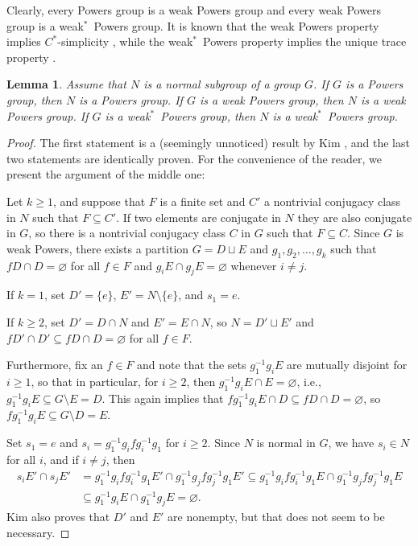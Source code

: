 \documentclass[a4paper]{amsart}
\theoremstyle{plain}
\newtheorem{lemma}[theorem]{Lemma}
\theoremstyle{definition}
\theoremstyle{remark}
\numberwithin{theorem}{section}
\begin{document}
Clearly, every Powers group is a weak Powers group and every weak Powers group is a weak$^*$~Powers group.
It is known that the weak Powers property implies $C^*$-simplicity \cite{Boca-Nitica},
while the weak$^*$~Powers property implies the unique trace property \cite[Section~5.2]{TD}.

\begin{lemma}\label{lem:normal Powers}
Assume that $N$ is a normal subgroup of a group $G$.
If $G$ is a Powers group, then $N$ is a Powers group.
If $G$ is a weak Powers group, then $N$ is a weak Powers group.
If $G$ is a weak$^*$~Powers group, then $N$ is a weak$^*$~Powers group.
\end{lemma}

\begin{proof}
The first statement is a (seemingly unnoticed) result by Kim \cite[Theorem~1]{Kim},
and the last two statements are identically proven.
For the convenience of the reader, we present the argument of the middle one:

Let $k\geq 1$, and suppose that $F$ is a finite set and $C'$ a nontrivial conjugacy class in $N$ such that $F\subseteq C'$.
If two elements are conjugate in $N$ they are also conjugate in $G$,
so there is a nontrivial conjugacy class $C$ in $G$ such that $F\subseteq C$.
Since $G$ is weak Powers, there exists a partition $G=D\sqcup E$ and $g_1,g_2,\dotsc, g_k$ such that
$fD\cap D=\varnothing$ for all $f\in F$ and $g_iE\cap g_jE=\varnothing$ whenever $i\neq j$.

If $k=1$, set $D'=\{e\}$, $E'=N\setminus\{e\}$, and $s_1=e$.

If $k\geq 2$, set $D'=D\cap N$ and $E'=E\cap N$,
so $N=D'\sqcup E'$ and $fD'\cap D'\subseteq fD\cap D=\varnothing$ for all $f\in F$.

Furthermore, fix an $f\in F$ and note that the sets $g_1^{-1}g_iE$ are mutually disjoint for $i\geq 1$,
so that in particular, for $i\geq 2$, then $g_1^{-1}g_iE\cap E=\varnothing$, i.e., $g_1^{-1}g_iE\subseteq G\setminus E=D$.
This again implies that $fg_1^{-1}g_iE\cap D\subseteq fD\cap D=\varnothing$, so $fg_1^{-1}g_iE\subseteq G\setminus D=E$.

Set $s_1=e$ and $s_i=g_1^{-1}g_ifg_i^{-1}g_1$ for $i\geq 2$.
Since $N$ is normal in $G$, we have $s_i\in N$ for all $i$, and if $i\neq j$, then
\[
\begin{split}
s_iE'\cap s_jE'&=g_1^{-1}g_ifg_i^{-1}g_1E'\cap g_1^{-1}g_jfg_j^{-1}g_1E'
\subseteq g_1^{-1}g_ifg_i^{-1}g_1E \cap g_1^{-1}g_jfg_j^{-1}g_1E \\
& \subseteq g_1^{-1}g_iE \cap g_1^{-1}g_jE = \varnothing.
\end{split}
\]
Kim also proves that $D'$ and $E'$ are nonempty, but that does not seem to be necessary.
\end{proof}
\end{document}
